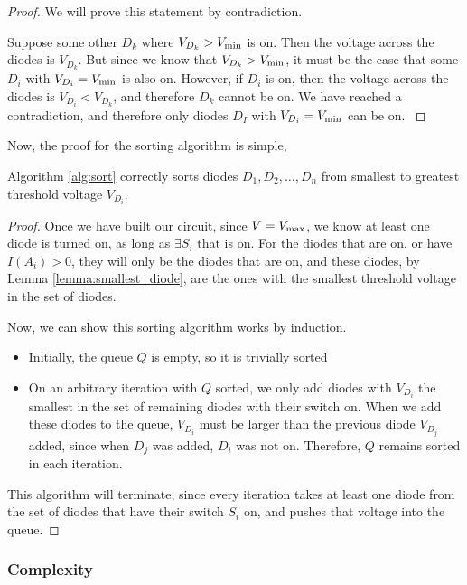 \begin{proof}
  We will prove this statement by contradiction.

  Suppose some other $D_k$ where $V_{D_k} > V_\text{min}$ is on. Then the voltage
  across the diodes is $V_{D_k}$. But since we know that $V_{D_k} >
    V_\text{min}$, it must be the case that some $D_i$ with $V_{D_i} = V_\text{min}$ is also
  on. However, if $D_i$ is on, then the voltage across the diodes is $V_{D_i}
    < V_{D_k}$, and therefore $D_k$ cannot be on. We have reached a
  contradiction, and therefore only diodes $D_I$ with $V_{D_i} = V_\text{min}$ can
  be on.
  \label{lemma:smallest_diode}
\end{proof}

Now, the proof for the sorting algorithm is simple,

\begin{theorem}
  Algorithm \ref{alg:sort} correctly sorts diodes $D_1, D_2, \dots, D_n$ from
  smallest to greatest threshold voltage $V_{D_i}$.
\end{theorem}
\begin{proof}
  Once we have built our circuit, since $V = V_\text{max}$, we know at least one
  diode is turned on, as long as $\exists S_i$ that is on.
  For the diodes that are on, or have $I(A_i) > 0$, they will only be the
  diodes that are on, and these diodes, by Lemma \ref{lemma:smallest_diode},
  are the ones with the smallest threshold voltage in the set of diodes.

  Now, we can show this sorting algorithm works by induction.

  \begin{itemize}
    \item Initially, the queue $Q$ is empty, so it is trivially sorted
    \item On an arbitrary iteration with $Q$ sorted, we only add diodes
          with $V_{D_i}$ the smallest in the set of remaining diodes with their switch on.
          When we add these diodes to the queue, $V_{D_i}$ must be larger than the
          previous diode $V_{D_j}$ added, since when $D_j$ was added, $D_i$ was not on.
          Therefore, $Q$ remains sorted in each iteration.
  \end{itemize}

  This algorithm will terminate, since every iteration takes at least one diode from the set of diodes that have their switch $S_i$ on, and pushes that voltage into the queue.
\end{proof}

\subsubsection{Complexity}

